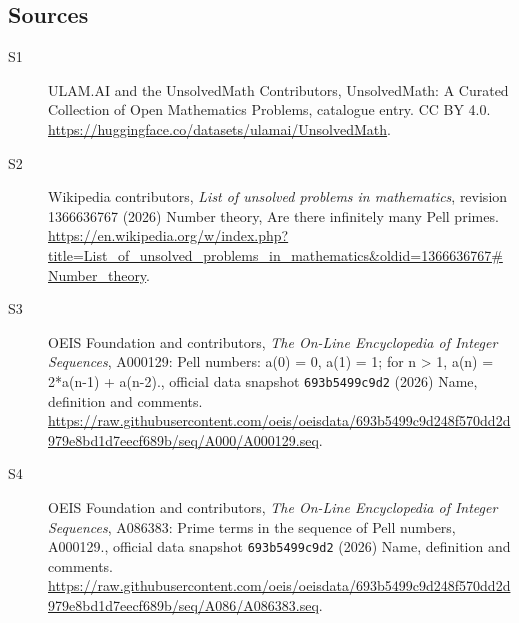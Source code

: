 \documentclass[11pt]{article}
\begin{document}
\subsection{Sources}
\begin{description}
\item[\hypertarget{source:statement:1}{S1}] ULAM.AI and the UnsolvedMath Contributors, UnsolvedMath: A Curated Collection of Open Mathematics Problems, catalogue entry. CC BY 4.0. \url{https://huggingface.co/datasets/ulamai/UnsolvedMath}.
\item[\hypertarget{source:statement:2}{S2}] Wikipedia contributors, \emph{List of unsolved problems in mathematics}, revision 1366636767 (2026) Number theory, Are there infinitely many Pell primes. \url{https://en.wikipedia.org/w/index.php?title=List_of_unsolved_problems_in_mathematics&oldid=1366636767#Number_theory}.
\item[\hypertarget{source:statement:3}{S3}] OEIS Foundation and contributors, \emph{The On-Line Encyclopedia of Integer Sequences}, A000129: Pell numbers: a(0) = 0, a(1) = 1; for n > 1, a(n) = 2*a(n-1) + a(n-2)., official data snapshot \texttt{693b5499c9d2} (2026) Name, definition and comments. \url{https://raw.githubusercontent.com/oeis/oeisdata/693b5499c9d248f570dd2d979e8bd1d7eecf689b/seq/A000/A000129.seq}.
\item[\hypertarget{source:statement:4}{S4}] OEIS Foundation and contributors, \emph{The On-Line Encyclopedia of Integer Sequences}, A086383: Prime terms in the sequence of Pell numbers, A000129., official data snapshot \texttt{693b5499c9d2} (2026) Name, definition and comments. \url{https://raw.githubusercontent.com/oeis/oeisdata/693b5499c9d248f570dd2d979e8bd1d7eecf689b/seq/A086/A086383.seq}.
\end{description}
\label{end:statement}
\end{document}
